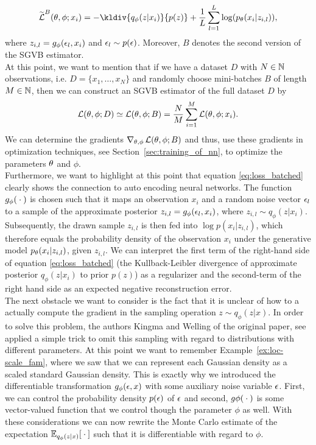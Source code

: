 \begin{align}\label{eq:loss_batched}
\tilde{\loss}^{B}(\t, \phi; x_i) = - \kldiv{q_{\phi}(z|x_i)}{p(z)} + \frac{1}{L} \sum_{l=1}^L \log(p_{\t}(x_i|z_{i,l})),
\end{align}
where $z_{i,l} = g_{\phi} (\operatorname{\epsilon}_l, x_i)$ and $\operatorname{\epsilon}_l\sim p(\operatorname{\epsilon})$. Moreover, $B$ denotes the second version of the SGVB estimator.\\
At this point, we want to mention that if we have a dataset $D$ with $N\in\operatorname{\mathbb{N}}$ observations, i.e. $D=\{x_1,\ldots, x_N\}$ and randomly choose mini-batches $B$ of length $M\in\operatorname{\mathbb{N}}$, then we can construct an SGVB estimator of the full dataset $D$ by
\begin{align*}
\operatorname{\mathcal{L}}(\theta, \phi; D) \simeq \operatorname{\mathcal{L}}(\theta, \phi; B) = \frac{N}{M} \sum_{i=1}^M\operatorname{\mathcal{L}}(\theta, \phi; x_i).
\end{align*}
We can determine the gradients $\nabla_{\theta,\phi}\operatorname{\mathcal{L}}(\theta, \phi; B)$ and thus, use these gradients in optimization techniques, see Section~\ref{sec:training_of_nn}, to optimize the parameters $\theta$ and $\phi$.\\
Furthermore, we want to highlight at this point that equation \eqref{eq:loss_batched} clearly shows the connection to auto encoding neural networks. The function $g_{\phi}({}\cdot{})$ is chosen such that it maps an observation $x_i$ and a random noise vector $\operatorname{\epsilon}_l$ to a sample of the approximate posterior $z_{i,l} = g_{\phi}(\operatorname{\epsilon}_l, x_i)$, where $z_{i,l}\sim q_{\phi}(z|x_i)$. Subsequently, the drawn sample $z_{i,l}$ is then fed into $\log p(x_i|z_{i,l})$, which therefore equals the probability density of the observation $x_i$ under the generative model $p_{\theta}(x_i|z_{i,l})$, given $z_{i,l}$. We can interpret the first term of the right-hand side of equation \eqref{eq:loss_batched} (the Kullback-Leibler divergence of approximate posterior $q_{\phi}(z|x_i)$ to prior $p(z)$) as a regularizer and the second-term of the right hand side as an expected negative reconstruction error.\\
The next obstacle we want to consider is the fact that it is unclear of how to a actually compute the gradient in the sampling operation $z\sim q_{\phi}(z|x)$. In order to solve this problem, the authors Kingma and Welling of the original paper, see \cite{kingma2013auto} applied a simple trick to omit this sampling with regard to distributions with different parameters. At this point we want to remember Example~\ref{ex:loc-scale_fam}, where we saw that we can represent each Gaussian density as a scaled standard Gaussian density. This is exactly why we introduced the differentiable transformation $g_{\phi}(\operatorname{\epsilon}, x)$ with some auxiliary noise variable $\operatorname{\epsilon}$. First, we can control the probability density $p(\operatorname{\epsilon})$ of $\operatorname{\epsilon}$ and second, $g\phi({}\cdot{})$ is some vector-valued function that we control though the parameter $\phi$ as well. With these considerations we can now rewrite the Monte Carlo estimate of the expectation $\operatorname{\mathbb{E}}_{q_{\phi}(z|x)}[{}\cdot{}]$ such that it is differentiable with regard to $\phi$.
